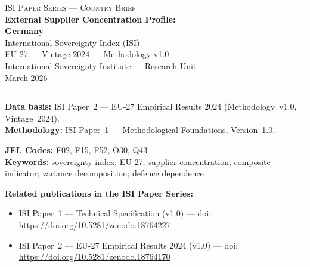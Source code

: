 \documentclass[12pt,a4paper]{article}
\begin{document}
\hypersetup{pageanchor=false}

\begin{titlepage}
\centering
\vspace*{2cm}
{\Large\textsc{ISI Paper Series --- Country Brief}}\\[1.2cm]
{\LARGE\bfseries External Supplier Concentration Profile:\\[0.3em]
Germany}\\[1.5cm]
{\large International Sovereignty Index (ISI)\\[0.3em]
EU-27 --- Vintage 2024 --- Methodology v1.0}\\[1.2cm]
{\large International Sovereignty Institute --- Research Unit}\\[0.8cm]
{\large March 2026}

\vspace{0.8cm}
\noindent\rule{\textwidth}{0.4pt}
\vspace{0.4cm}

\begin{flushleft}
\noindent\textbf{Data basis:} ISI Paper~2 --- EU-27 Empirical Results 2024 (Methodology~v1.0, Vintage~2024).\\[4pt]
\noindent\textbf{Methodology:} ISI Paper~1 --- Methodological Foundations, Version~1.0.

\medskip

\noindent\textbf{JEL Codes:} F02, F15, F52, O30, Q43\\[4pt]
\noindent\textbf{Keywords:} sovereignty index; EU-27; supplier concentration; composite indicator; variance decomposition; defence dependence

\medskip

\noindent\textbf{Related publications in the ISI Paper Series:}
\begin{itemize}[nosep,leftmargin=1.5em]
\item ISI Paper~1 --- Technical Specification (v1.0) --- doi:\\
  \url{https://doi.org/10.5281/zenodo.18764227}
\item ISI Paper~2 --- EU-27 Empirical Results 2024 (v1.0) --- doi:\\
  \url{https://doi.org/10.5281/zenodo.18764170}
\end{itemize}
\end{flushleft}
\vfill
\end{titlepage}
\end{document}
